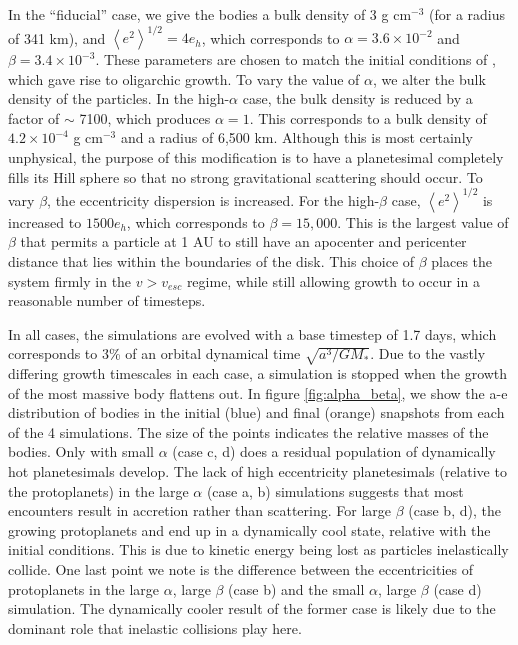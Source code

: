 In the ``fiducial'' case, we give the bodies a bulk density of 3 g
cm$^{-3}$ (for a radius of 341 km), and $\left< e^{2} \right>^{1/2} = 4 e_{h}$, which corresponds to $\alpha = 3.6 \times 10^{-2}$ and $\beta = 3.4 \times 10^{-3}$. These parameters are chosen to match the initial conditions of \cite{kokubo98}, which gave rise to oligarchic growth. 
To vary the value of $\alpha$, we alter the bulk density of the particles. In the high-$\alpha$ case, the bulk density is reduced by 
a factor of $\sim$ 7100, which produces $\alpha = 1$. This corresponds to a bulk density of $4.2 \times 10^{-4}$ g cm$^{-3}$ and a radius of 6,500 km. 
Although this is most certainly unphysical, the purpose of this modification is to have a planetesimal completely fills its Hill sphere so that no strong 
gravitational scattering should occur. To vary $\beta$, the eccentricity dispersion is increased. For the high-$
\beta$ case, $\left< e^{2} \right>^{1/2}$ is increased to $1500 e_{h}$, which corresponds to $\beta = 15,000$. This is the largest value of $\beta$ that permits a particle at 1 AU to still have an apocenter and pericenter distance that lies within the boundaries of the disk. This choice of $\beta$ places the system firmly in the $v > v_{esc}$ regime, while still allowing growth to occur in a reasonable number of timesteps.

In all cases, the simulations are evolved with a base timestep of 1.7
days, which corresponds to 3\% of an orbital dynamical time
$\sqrt{a^3/G M_{*}}$. Due to the vastly differing growth timescales in
each case, a simulation is stopped when the growth of the most massive
body flattens out. In figure \ref{fig:alpha_beta}, we show the a-e
distribution of bodies in the initial (blue) and final (orange)
snapshots from each of the 4 simulations. The size of the points
indicates the relative masses of the bodies. Only with small
$\alpha$ (case c, d) does a residual population of dynamically hot planetesimals
develop. The lack of high eccentricity planetesimals (relative to the protoplanets) in the large
$\alpha$ (case a, b) simulations suggests that most encounters result in accretion
rather than scattering. For large $\beta$ (case b, d), the growing protoplanets
and end up in a dynamically cool state,
relative with the initial conditions. This is due to kinetic energy 
being lost as particles inelastically collide. One last point we note
is the difference between the eccentricities of protoplanets in the 
large $\alpha$, large $\beta$ (case b) and the small $\alpha$,
large $\beta$ (case d) simulation. The dynamically cooler result of the former case
is likely due to the dominant role that inelastic collisions play here.

